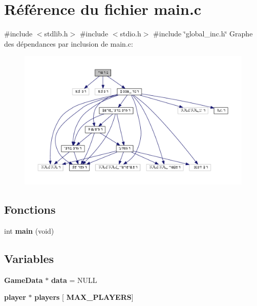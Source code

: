 \section{Référence du fichier main.\+c}
\label{main_8c}
{\ttfamily \#include $<$stdlib.\+h$>$}\newline
{\ttfamily \#include $<$stdio.\+h$>$}\newline
{\ttfamily \#include \char`\"{}global\+\_\+inc.\+h\char`\"{}}\newline
Graphe des dépendances par inclusion de main.\+c\+:
\nopagebreak
\begin{figure}[H]
\begin{center}
\leavevmode
\includegraphics[width=350pt]{main_8c__incl}
\end{center}
\end{figure}
\subsection*{Fonctions}
\begin{DoxyCompactItemize}
\item 
\mbox{\label{main_8c_a840291bc02cba5474a4cb46a9b9566fe}} 
int {\bfseries main} (void)
\end{DoxyCompactItemize}
\subsection*{Variables}
\begin{DoxyCompactItemize}
\item 
\textbf{ Game\+Data} $\ast$ \textbf{ data} = N\+U\+LL
\item 
\mbox{\label{main_8c_a584a54ede29d504a2dc81d981781524c}} 
\textbf{ player} $\ast$ {\bfseries players} [\textbf{ M\+A\+X\+\_\+\+P\+L\+A\+Y\+E\+RS}]
\end{DoxyCompactItemize}


